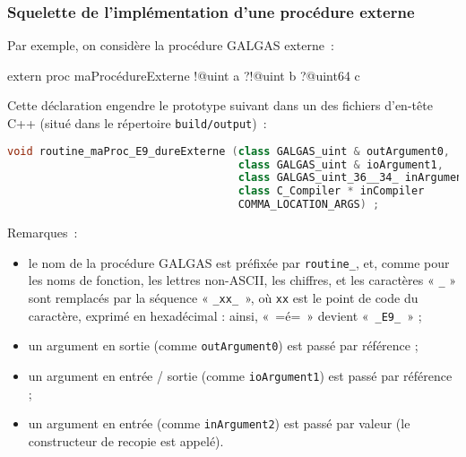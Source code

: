 \subsubsection{Squelette de l'implémentation d'une procédure externe}

Par exemple, on considère la procédure GALGAS externe~:
\begin{galgas}
extern proc maProcédureExterne !@uint a ?!@uint b ?@uint64 c
\end{galgas}

Cette déclaration engendre le prototype suivant dans un des fichiers d'en-tête C++ (situé dans le répertoire \texttt{build/output})~:
\begin{lstlisting}[language=C++]
void routine_maProc_E9_dureExterne (class GALGAS_uint & outArgument0,
                                    class GALGAS_uint & ioArgument1,
                                    class GALGAS_uint_36__34_ inArgument2,
                                    class C_Compiler * inCompiler
                                    COMMA_LOCATION_ARGS) ;
\end{lstlisting}

Remarques~:
\begin{itemize}
  \item le nom de la procédure GALGAS est préfixée par \texttt{routine\_}, et, comme pour les noms de fonction, les lettres non-ASCII, les chiffres, et les caractères « \texttt{\_} »  sont remplacés par la séquence « \texttt{\_xx\_ }», où \texttt{xx} est le point de code du caractère, exprimé en hexadécimal : ainsi, «~\ggs=é=~» devient «~\texttt{\_E9\_}~» ;
  \item un argument en sortie (comme \texttt{outArgument0}) est passé par référence ;
  \item un argument en entrée / sortie (comme \texttt{ioArgument1}) est passé par référence ;
  \item un argument en entrée (comme \texttt{inArgument2}) est passé par valeur (le constructeur de recopie est appelé).
\end{itemize}


